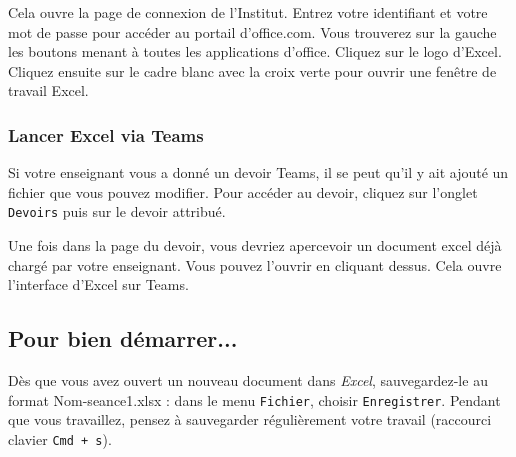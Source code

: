 Cela ouvre la page de connexion de l'Institut. Entrez votre identifiant et votre mot de passe pour accéder au portail d'office.com. Vous trouverez sur la gauche les boutons menant à toutes les applications d'office. Cliquez sur le logo d'Excel. Cliquez ensuite sur le cadre blanc avec la croix verte pour ouvrir une fenêtre de travail Excel.


\subsubsection{Lancer Excel via Teams}

Si votre enseignant vous a donné un devoir Teams, il se peut qu'il y ait ajouté un fichier que vous pouvez modifier. Pour accéder au devoir, cliquez sur l'onglet \texttt{Devoirs}  puis sur le devoir attribué. 


Une fois dans la page du devoir, vous devriez apercevoir un document excel déjà chargé par votre enseignant. Vous pouvez l'ouvrir en cliquant dessus. Cela ouvre l'interface d'Excel sur Teams.



%
%
%
%


\subsection{Pour bien démarrer...}

Dès que vous avez ouvert un nouveau document dans \emph{Excel}, sauvegardez-le au format Nom-seance1.xlsx : dans le menu \texttt{Fichier}, choisir \texttt{Enregistrer}. Pendant que vous travaillez, pensez à sauvegarder régulièrement votre travail (raccourci clavier \texttt{Cmd + s}).   



